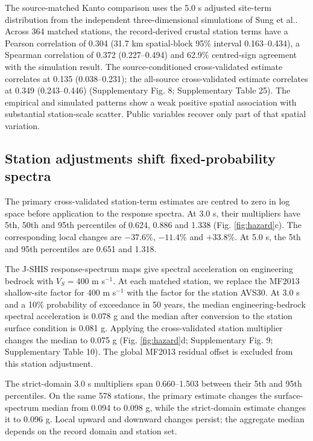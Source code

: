 \documentclass[11pt]{article}
\begin{document}
The source-matched Kanto comparison uses the 5.0 s adjusted site-term distribution from the independent three-dimensional simulations of Sung et al.\cite{sung2025}. Across 364 matched stations, the record-derived crustal station terms have a Pearson correlation of 0.304 (31.7 km spatial-block 95\% interval 0.163--0.434), a Spearman correlation of 0.372 (0.227--0.494) and 62.9\% centred-sign agreement with the simulation result. The source-conditioned cross-validated estimate correlates at 0.135 (0.038--0.231); the all-source cross-validated estimate correlates at 0.349 (0.243--0.446) (Supplementary Fig. 8; Supplementary Table 25). The empirical and simulated patterns show a weak positive spatial association with substantial station-scale scatter. Public variables recover only part of that spatial variation.

\subsection{Station adjustments shift fixed-probability spectra}

The primary cross-validated station-term estimates are centred to zero in log space before application to the response spectra. At 3.0 s, their multipliers have 5th, 50th and 95th percentiles of 0.624, 0.886 and 1.338 (Fig. \ref{fig:hazard}c). The corresponding local changes are $-37.6\%$, $-11.4\%$ and $+33.8\%$. At 5.0 s, the 5th and 95th percentiles are 0.651 and 1.318.

The J-SHIS response-spectrum maps give spectral acceleration on engineering bedrock with $V_S=400$ m s$^{-1}$. At each matched station, we replace the MF2013 shallow-site factor for 400 m s$^{-1}$ with the factor for the station AVS30. At 3.0 s and a 10\% probability of exceedance in 50 years, the median engineering-bedrock spectral acceleration is 0.078 g and the median after conversion to the station surface condition is 0.081 g. Applying the cross-validated station multiplier changes the median to 0.075 g (Fig. \ref{fig:hazard}d; Supplementary Fig. 9; Supplementary Table 10). The global MF2013 residual offset is excluded from this station adjustment.

The strict-domain 3.0 s multipliers span 0.660--1.503 between their 5th and 95th percentiles. On the same 578 stations, the primary estimate changes the surface-spectrum median from 0.094 to 0.098 g, while the strict-domain estimate changes it to 0.096 g. Local upward and downward changes persist; the aggregate median depends on the record domain and station set.
\end{document}
